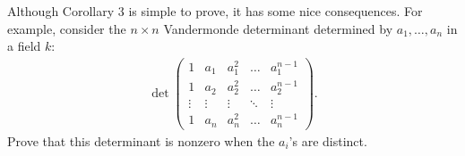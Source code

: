 \begin{exercise}{2}
Although Corollary $3$ is simple to prove, it has some nice consequences. 
For example, consider the $n\times n$ Vandermonde determinant determined by $a_1,\dots,a_n$ in a field $k$:
\begin{align}
    \det
    \left(\begin{array}{ccccc}
        1 & a_1 & a_1^2 & \hdots & a_1^{n-1}\\
        1 & a_2 & a_2^2 & \hdots & a_2^{n-1}\\
        \vdots & \vdots & \vdots & \ddots & \vdots\\
        1 & a_n & a_n^2 & \hdots & a_n^{n-1}
    \end{array}\right).
\end{align}
Prove that this determinant is nonzero when the $a_i$'s are distinct.
\end{exercise}
